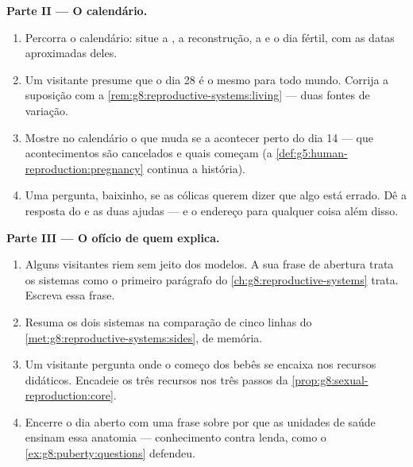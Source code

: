 \begin{problem}
\medskip\noindent\textbf{Parte II --- O calendário.}
\begin{enumerate}[resume]
  \item Percorra o calendário: situe a , a reconstrução, a
         e o dia fértil, com as datas aproximadas deles.
  \item Um visitante presume que o dia 28 é o mesmo para todo mundo.
        Corrija a suposição com a
        \cref{rem:g8:reproductive-systems:living} --- duas fontes de
        variação.
  \item Mostre no calendário o que muda se a  acontecer
        perto do dia 14 --- que acontecimentos são cancelados e quais
        começam (a \cref{def:g5:human-reproduction:pregnancy} continua
        a história).
  \item Uma  pergunta, baixinho, se as cólicas querem
        dizer que algo está errado. Dê a resposta do  e as duas
        ajudas --- e o endereço para qualquer coisa além disso.
\end{enumerate}

\medskip\noindent\textbf{Parte III --- O ofício de quem
explica.}
\begin{enumerate}[resume]
  \item Alguns visitantes riem sem jeito dos modelos. A sua frase de
        abertura trata os sistemas como o primeiro parágrafo do
        \cref{ch:g8:reproductive-systems} trata. Escreva essa frase.
  \item Resuma os dois sistemas na comparação de cinco linhas do
        \cref{met:g8:reproductive-systems:sides}, de memória.
  \item Um visitante pergunta onde o começo dos bebês se encaixa nos
        recursos didáticos. Encadeie os três recursos nos três passos
        da \cref{prop:g8:sexual-reproduction:core}.
  \item Encerre o dia aberto com uma frase sobre por que as unidades
        de saúde ensinam essa anatomia --- conhecimento contra lenda,
        como o \cref{ex:g8:puberty:questions} defendeu.
\end{enumerate}
\end{problem}
